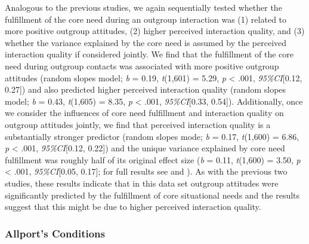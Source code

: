 Analogous to the previous studies, we again sequentially tested whether
the fulfillment of the core need during an outgroup interaction was (1)
related to more positive outgroup attitudes, (2) higher perceived
interaction quality, and (3) whether the variance explained by the core
need is assumed by the perceived interaction quality if considered
jointly. We find that the fulfillment of the core need during outgroup
contacts was associated with more positive outgroup attitudes (random
slopes model; \textit{b} = 0.19, \textit{t}(1,601) = 5.29, \textit{p}
\textless{} .001, \textit{95\%CI}{[}0.12, 0.27{]}) and also predicted
higher perceived interaction quality (random slopes model; \textit{b} =
0.43, \textit{t}(1,605) = 8.35, \textit{p} \textless{} .001,
\textit{95\%CI}{[}0.33, 0.54{]}). Additionally, once we consider the
influences of core need fulfillment and interaction quality on outgroup
attitudes jointly, we find that perceived interaction quality is a
substantially stronger predictor (random slopes mode; \textit{b} = 0.17,
\textit{t}(1,600) = 6.86, \textit{p} \textless{} .001,
\textit{95\%CI}{[}0.12, 0.22{]}) and the unique variance explained by
core need fulfillment was roughly half of its original effect size
(\textit{b} = 0.11, \textit{t}(1,600) = 3.50, \textit{p} \textless{}
.001, \textit{95\%CI}{[}0.05, 0.17{]}; for full results see
 and
). As with the previous two studies,
these results indicate that in this data set outgroup attitudes were
significantly predicted by the fulfillment of core situational needs and
the results suggest that this might be due to higher perceived
interaction quality.

\subsubsection{Allport's Conditions}

